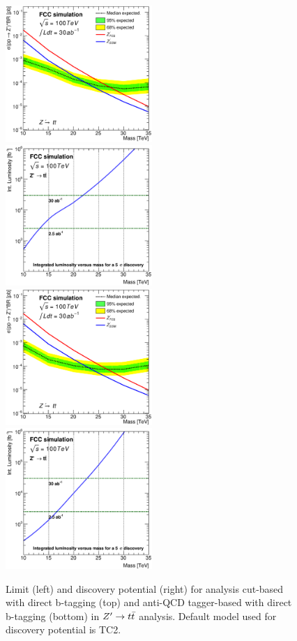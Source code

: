 \documentclass{cernrep}
\begin{document}
\begin{figure}[!htb]\centering
\includegraphics[width=0.495\textwidth]{Fig/Zptt/lim_Zprime_tt_fcc_v02_cut.eps}
\includegraphics[width=0.495\textwidth]{Fig/Zptt/DiscoveryPotential_tt_cut_rootStyle.eps}
\includegraphics[width=0.495\textwidth]{Fig/Zptt/lim_Zprime_tt_fcc_v02_tagger.eps}
\includegraphics[width=0.495\textwidth]{Fig/Zptt/DiscoveryPotential_tt_TC2_tagger_rootStyle.eps}
\caption{Limit (left) and discovery potential (right) for analysis cut-based with direct b-tagging (top) and anti-QCD tagger-based with direct b-tagging (bottom) in $Z^{\prime} \rightarrow t\bar{t}$ analysis. Default model used for discovery potential is TC2.}
\label{fig:Zptt_limit_direct}
\end{figure}
\end{document}
